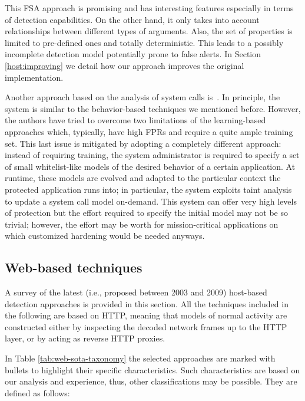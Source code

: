 This \ac{FSA} approach is promising and has interesting
features especially in terms of detection capabilities. On the other
hand, it only takes into account relationships between different types
of arguments. Also, the set of properties is limited to pre-defined
ones and totally deterministic. This leads to a possibly incomplete
detection model potentially prone to false alerts. In Section
\ref{host:improving} we detail how our approach improves the original
implementation.

Another approach based on the analysis of system calls
is~\citep{1352621}. In principle, the system is similar to the
behavior-based techniques we mentioned before. However, the authors
have tried to overcome two limitations of the learning-based
approaches which, typically, have high \acp{FPR} and require a quite
ample training set. This last issue is mitigated by adopting a
completely different approach: instead of requiring training, the
system administrator is required to specify a set of small
whitelist-like models of the desired behavior of a certain
application. At runtime, these models are evolved and adapted to the
particular context the protected application runs into; in particular,
the system exploits taint analysis to update a system call model
on-demand. This system can offer very high levels of protection but
the effort required to specify the initial model may not be so
trivial; however, the effort may be worth for mission-critical
applications on which customized hardening would be needed anyways.

\subsection{Web-based techniques}
\label{detection:ad:web} A survey of the latest (i.e., proposed
between 2003 and 2009) host-based detection approaches is provided in
this section. All the techniques included in the following are based
on \ac{HTTP}, meaning that models of normal activity are
constructed either by inspecting the decoded network frames up to the
\ac{HTTP} layer, or by acting as reverse
\ac{HTTP} proxies.

In Table \ref{tab:web-sota-taxonomy} the selected approaches are
marked with bullets to highlight their specific characteristics. Such
characteristics are based on our analysis and experience, thus, other
classifications may be possible. They are defined as follows:

